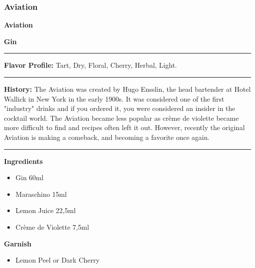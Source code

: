 \subsubsection{Aviation}
\noindent
\begin{minipage}{.49\textwidth}
    \noindent\textbf{\LARGE Aviation}
\end{minipage}
\hspace{.02\textwidth}
\begin{minipage}{.49\textwidth}
    \raggedleft
    \textbf{\large Gin}\\
\end{minipage}
\vspace{.5em}\hrule\vspace{.5em}
\noindent
\textbf{\large Flavor Profile:} Tart, Dry, Floral, Cherry, Herbal, Light.
\vspace{.5em}\hrule\vspace{.5em}
\noindent
\textbf{\large History:} The Aviation was created by Hugo Ensslin, the head bartender at Hotel Wallick in New York in the early 1900s. It was considered one of the first "industry" drinks and if you ordered it, you were considered an insider in the cocktail world. The Aviation became less popular as crème de violette became more difficult to find and recipes often left it out. However, recently the original Aviation is making a comeback, and becoming a favorite once again.
\vspace{.5em}\hrule\vspace{.5em}
\noindent
\begin{minipage}[t]{.49\textwidth}
    \noindent
    \textbf{\large Ingredients}
    \begin{itemize}
        \item Gin 60ml
        \item Maraschino 15ml
        \item Lemon Juice 22,5ml
        \item Crème de Violette 7,5ml
    \end{itemize}
    \noindent
    \textbf{\large Garnish}
    \begin{itemize}
        \item Lemon Peel or Dark Cherry
    \end{itemize}
\end{minipage}
